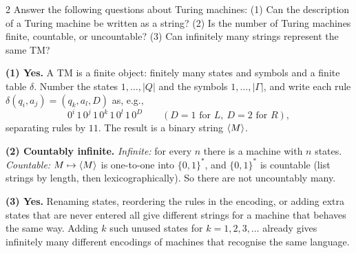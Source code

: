 \begin{question}{2}
Answer the following questions about Turing machines:
(1) Can the description of a Turing machine be written as a string?
(2) Is the number of Turing machines finite, countable, or uncountable?
(3) Can infinitely many strings represent the same TM?
\end{question}
\begin{soln}
\textbf{(1) Yes.} A TM is a finite object: finitely many states and symbols and a finite table $\delta$. Number the states $1,\dots,|Q|$ and the symbols $1,\dots,|\Gamma|$, and write each rule $\delta(q_i,a_j)=(q_k,a_l,D)$ as, e.g.,
\[
0^i\,1\,0^j\,1\,0^k\,1\,0^l\,1\,0^{D}
\qquad (D=1 \text{ for } L,\ D=2 \text{ for } R),
\]
separating rules by $11$. The result is a binary string $\langle M\rangle$.

\textbf{(2) Countably infinite.}
\emph{Infinite:} for every $n$ there is a machine with $n$ states.
\emph{Countable:} $M\mapsto\langle M\rangle$ is one-to-one into $\{0,1\}^*$, and $\{0,1\}^*$ is countable (list strings by length, then lexicographically). So there are not uncountably many.

\textbf{(3) Yes.} Renaming states, reordering the rules in the encoding, or adding extra states that are never entered all give different strings for a machine that behaves the same way. Adding $k$ such unused states for $k=1,2,3,\dots$ already gives infinitely many different encodings of machines that recognise the same language.
\end{soln}

